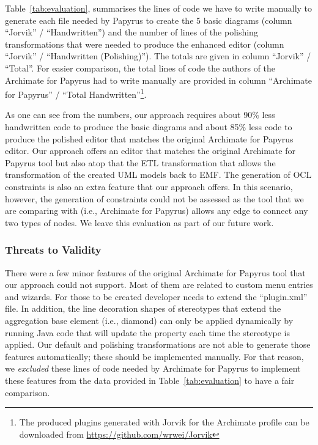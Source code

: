 Table~\ref{tab:evaluation}, summarises the lines of code we have to write manually to generate each file needed by Papyrus to create the 5 basic diagrams (column ``Jorvik'' / ``Handwritten'') and the number of lines of the polishing transformations that were needed to produce the enhanced editor (column ``Jorvik'' / ``Handwritten (Polishing)''). 
The totals are given in column ``Jorvik'' / ``Total''. 
For easier comparison, the total lines of code the authors of the Archimate for Papyrus had to write manually are provided in column ``Archimate for Papyrus'' / ``Total Handwritten''\footnote{The produced plugins generated with Jorvik for the Archimate profile can be downloaded from \url{https://github.com/wrwei/Jorvik}}.

As one can see from the numbers, our approach requires about 90\% less handwritten code to produce the basic diagrams and about 85\% less code to 
produce the polished editor that matches the original Archimate for Papyrus editor. 
Our approach offers an editor that matches the original Archimate for Papyrus tool but also atop that the ETL transformation that allows the transformation of the created UML models back to EMF. 
The generation of OCL constraints is also an extra feature that our approach offers. 
In this scenario, however, the generation of constraints could not be assessed as the tool that we are comparing with (i.e., Archimate for Papyrus) allows any edge to connect any two types of nodes. We leave this evaluation as part of our future work.

\subsubsection{Threats to Validity}
There were a few minor features of the original Archimate for Papyrus tool that our approach could not support. 
Most of them are related to custom menu entries and wizards. For those to be created developer needs to extend the ``plugin.xml'' file. 
In addition, the line decoration shapes of stereotypes that extend the aggregation base element (i.e., diamond) can only be applied dynamically by running Java code that will update the property each time the stereotype is applied. 
Our default and polishing transformations are not able to generate those features automatically; these should be implemented manually. 
For that reason, we \textit{excluded} these lines of code needed by Archimate for Papyrus to implement these features from the data provided in Table~\ref{tab:evaluation} to have a fair comparison. 

